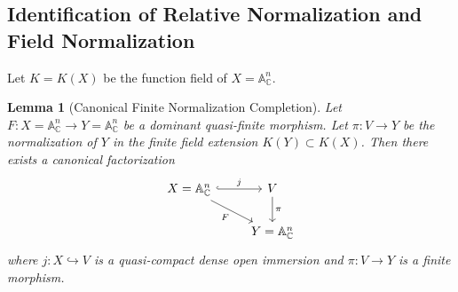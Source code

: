 \documentclass[11pt,reqno]{amsart}
\theoremstyle{plain}
\newtheorem{lemma}[theorem]{Lemma}
\theoremstyle{definition}
\numberwithin{equation}{section}
\newcommand{\A}{\mathbb{A}}
\newcommand{\C}{\mathbb{C}}
\begin{document}
\subsection{Identification of Relative Normalization and Field Normalization}
Let $K = K(X)$ be the function field of $X = \A^n_\C$.

\begin{lemma}[Canonical Finite Normalization Completion]\label{lem:finite-completion}
Let $F: X = \A^n_\C \to Y = \A^n_\C$ be a dominant quasi-finite morphism. Let $\pi: V \to Y$ be the normalization of $Y$ in the finite field extension $K(Y) \subset K(X)$.
Then there exists a canonical factorization
\begin{equation}\label{eq:finite-completion}
\begin{tikzcd}
X = \A^n_\C \arrow[r, hook, "j"] \arrow[rd, "F"'] & V \arrow[d, "\pi"] \\
& Y = \A^n_\C
\end{tikzcd}
\end{equation}
where $j: X \hookrightarrow V$ is a quasi-compact dense open immersion and $\pi: V \to Y$ is a finite morphism.
\end{lemma}
\end{document}
